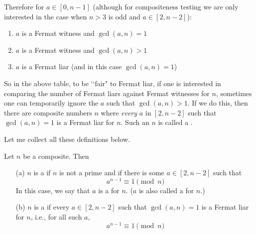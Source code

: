 Therefore for $a \in [0, n-1]$ (although for compositeness testing
we are only interested in the case when $n > 3$ is odd and $a \in [2, n-2]$):
\begin{enumerate}
  \item $a$ is a Fermat witness and $\gcd(a, n) = 1$
  \item $a$ is a Fermat witness and $\gcd(a, n) > 1$
  \item $a$ is a Fermat liar (and in this case $\gcd(a, n) = 1$)
\end{enumerate}
So in the above table, to be \lq\lq fair" to Fermat liar,
if one is interested in comparing the number of
Fermat liars against Fermat witnesses for $n$,
sometimes one can temporarily ignore the $a$ such that
$\gcd(a, n) > 1$.
If we do this, then
there are composite numbers $n$ where \textit{every} $a$ in $[2, n-2]$
such that $\gcd(a, n) = 1$ is a Fermat liar for $n$.
Such an $n$ is called a .

Let me collect all these definitions below.

\begin{defn}
  Let $n$ be a composite.
  Then
  \begin{enumerate}[nosep]
  \item[(a)] $n$ is a
    if $n$ is not a prime and 
    if there is some $a \in [2, n-2]$ such that 
    \[
    a^{n-1} \equiv 1 \pmod{n}
    \]
    In this case, we say that $a$ is a
     for $n$.
    ($a$ is also called a  for $n$.)
  \item[(b)] $n$ is a 
    if every $a \in [2, n-2]$ such that $\gcd(a, n) = 1$
    is a Fermat liar for $n$, i.e., for all such $a$,
    \[
    a^{n-1} \equiv 1 \pmod{n}
    \]
  \end{enumerate}
\end{defn}

